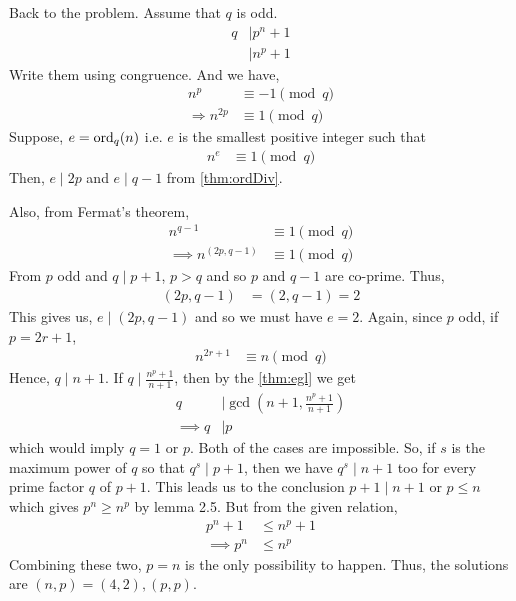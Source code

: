 \documentclass[problems.tex]{subfile}
\begin{document}
\begin{solution}
		Back to the problem.
		Assume that $q$ is odd.
			\begin{align*}
				q
					& \mid p^n+1\\
					& \mid n^p+1
			\end{align*}
		Write them using congruence. And we have,
			\begin{align*}
				n^p
					& \equiv-1\pmod q\\
				\Rightarrow n^{2p}
					& \equiv1\pmod q
			\end{align*}
		Suppose, $e=\operatorname{ord}_q(n)$ i.e. $e$ is the smallest positive integer such that
			\begin{align*}
				n^e
					& \equiv1\pmod q
			\end{align*}
		Then, $e\mid 2p$ and $e\mid q-1$ from \autoref{thm:ordDiv}.

		Also, from Fermat's theorem,
			\begin{align*}
				n^{q-1}
					& \equiv1\pmod q\\
				\implies n^{(2p,q-1)}
					& \equiv1\pmod q
			\end{align*}
		From $p$ odd and $q\mid p+1$, $p>q$ and so $p$ and $q-1$ are co-prime. Thus,
			\begin{align*}
				(2p,q-1)
					& =(2,q-1)=2
			\end{align*}
		This gives us, $e\mid (2p,q-1)$ and so we must have $e=2$. Again, since $p$ odd, if $p=2r+1$,
			\begin{align*}
				n^{2r+1}
					& \equiv n\pmod q
			\end{align*}
		Hence, $q\mid n+1$. If $q\mid \frac{n^p+1}{n+1}$, then by the \autoref{thm:egl} we get
			\begin{align*}
				q
					& \mid \gcd\left(n+1,\frac{n^p+1}{n+1}\right)\\
				\implies q
					& \mid p
			\end{align*}
		which would imply $q=1$ or $p$. Both of the cases are impossible. So, if $s$ is the maximum power of $q$ so that $q^s\mid p+1$, then we have $q^s\mid n+1$ too for every prime factor $q$ of $p+1$. This leads us to the conclusion $p+1\mid n+1$ or $p\le n$ which gives $p^n\ge n^p$ by lemma 2.5. But from the given relation,
			\begin{align*}
				p^n+1
					& \le n^p+1\\
				\implies p^n
					& \le n^p
			\end{align*}
		Combining these two, $p=n$ is the only possibility to happen. Thus, the solutions are $(n, p)=(4,2),(p, p)$.
	\end{solution}
\end{document}
